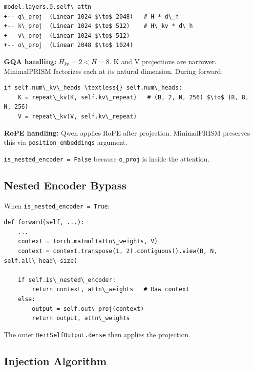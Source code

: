 \begin{lstlisting}
model.layers.0.self\_attn
+-- q\_proj  (Linear 1024 $\to$ 2048)   # H * d\_h
+-- k\_proj  (Linear 1024 $\to$ 512)    # H\_kv * d\_h
+-- v\_proj  (Linear 1024 $\to$ 512)
+-- o\_proj  (Linear 2048 $\to$ 1024)
\end{lstlisting}

\textbf{GQA handling:} $H_{kv} = 2 < H = 8$. K and V projections are narrower. 
MinimalPRISM factorizes each at its natural dimension. During forward:

\begin{lstlisting}
if self.num\_kv\_heads \textless{} self.num\_heads:
    K = repeat\_kv(K, self.kv\_repeat)   # (B, 2, N, 256) $\to$ (B, 8, N, 256)
    V = repeat\_kv(V, self.kv\_repeat)
\end{lstlisting}

\textbf{RoPE handling:} Qwen applies RoPE after projection. MinimalPRISM preserves 
this via \texttt{position\_embeddings} argument.

\texttt{is\_nested\_encoder = False} because \texttt{o\_proj} is inside the attention.

\subsection{Nested Encoder Bypass}

When \texttt{is\_nested\_encoder = True}:

\begin{lstlisting}
def forward(self, ...):
    ...
    context = torch.matmul(attn\_weights, V)
    context = context.transpose(1, 2).contiguous().view(B, N, self.all\_head\_size)
    
    if self.is\_nested\_encoder:
        return context, attn\_weights   # Raw context
    else:
        output = self.out\_proj(context)
        return output, attn\_weights
\end{lstlisting}

The outer \texttt{BertSelfOutput.dense} then applies the projection.

\subsection{Injection Algorithm}

